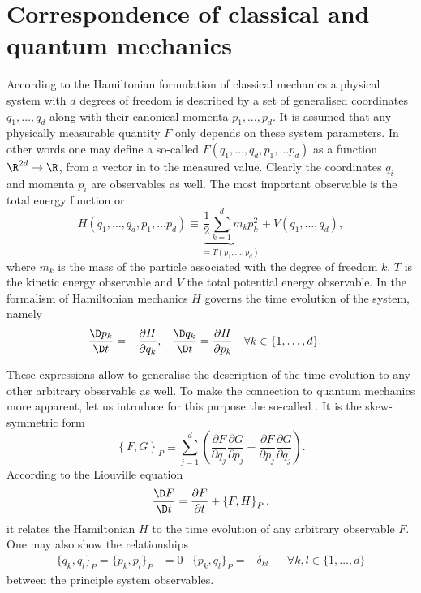 \section{Correspondence of classical and quantum mechanics}
\newcommand{\clphase}{(q_1, \ldots, q_d, p_1, \ldots p_d)}
%
According to the Hamiltonian formulation of classical mechanics
a physical system with $d$ degrees of freedom
is described by a set of generalised coordinates
$q_1, \ldots, q_d$ along with their canonical momenta $p_1, \ldots, p_d$.
It is assumed that any physically measurable quantity $F$
only depends on these system parameters.
In other words one may define a so-called 
$F\clphase$ as a function $\R^{2d} \to \R$, \ie
from a vector in  to the measured value.
Clearly the coordinates $q_i$ and momenta $p_i$ are observables as well.
The most important observable is the total energy function or 
\begin{equation}
	H\clphase
	\equiv \underbrace{\frac{1}{2} \sum_{k=1}^d m_k p_k^2}_{= T(p_1, \ldots, p_d)}
	+ V(q_1, \ldots, q_d),
	\label{eqn:HamiltonianClassical}
\end{equation}
where $m_k$ is the mass of the particle associated with
the degree of freedom $k$,
$T$ is the kinetic energy observable and $V$ the total potential energy observable.
In the formalism of Hamiltonian mechanics $H$ governs the time evolution
of the system, namely
\begin{align}
	\frac{\D p_k}{\D t} &= - \frac{\partial H}{\partial q_k}, &
	\frac{\D q_k}{\D t} &= \frac{\partial H}{\partial p_k}
	&&\forall k \in \{1, \ldots, d\}.
	\label{eqn:HamiltonianEqnMotion}
\end{align}

These expressions allow to generalise the description of the time evolution
to any other arbitrary observable as well.
To make the connection to quantum mechanics more apparent,
let us introduce for this purpose the so-called .
It is the skew-symmetric form
\begin{equation}
	\left\{ F, G \right\}_P \equiv \sum_{j=1}^d \left(
	\frac{\partial  F}{\partial q_j} \frac{\partial G}{\partial p_j}
	- \frac{\partial  F}{\partial p_j} \frac{\partial G}{\partial q_j}
	\right).
	\label{eqn:PoissonBracket}
\end{equation}
According to the Liouville equation
\begin{equation}
	\frac{\D F}{\D t} = \frac{\partial F}{\partial t} + \left\{ F, H \right\}_P.
	\label{eqn:PoissonTimeEvolution}
\end{equation}
it relates the Hamiltonian $H$ to the time evolution of any arbitrary observable $F$.
One may also show the relationships
\begin{align}
	\{ q_k, q_l \}_P = \{p_k, p_l\}_P &= 0 & \{ p_k, q_l\}_P = - \delta_{kl} &&\forall k,l \in \{1, \ldots, d\}
	\label{eqn:PoissonProperties}
\end{align}
between the principle system observables.

